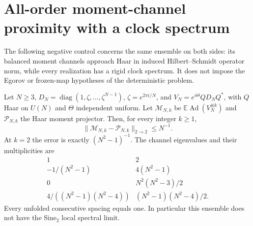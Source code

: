 \section{All-order moment-channel proximity with a clock spectrum}
\label{sec:isospectral-clock-control}
The following negative control concerns the same ensemble on both sides:
its balanced moment channels approach Haar in induced Hilbert--Schmidt
operator norm, while every realization has a rigid clock spectrum. It does
not impose the Egorov or frozen-map hypotheses of the deterministic problem.

\begin{theorem}
Let $N\ge3$, $D_N=\operatorname{diag}(1,\zeta,\ldots,\zeta^{N-1})$,
$\zeta=e^{2\pi i/N}$, and $V_N=e^{i\Theta}QD_NQ^*$, with $Q$ Haar on
$U(N)$ and $\Theta$ independent uniform. Let $\mathcal M_{N,k}$ be
$\mathbb E\operatorname{Ad}(V_N^{\otimes k})$ and $\mathcal P_{N,k}$ the
Haar moment projector. Then, for every integer $k\ge1$,
\[
 \|\mathcal M_{N,k}-\mathcal P_{N,k}\|_{2\to2}\le N^{-1}.
\]
At $k=2$ the error is exactly $(N^2-1)^{-1}$. The channel eigenvalues and
their multiplicities are
\[
\begin{array}{c|c}
1&2\\
-1/(N^2-1)&4(N^2-1)\\
0&N^2(N^2-3)/2\\
4/((N^2-1)(N^2-4))&(N^2-1)(N^2-4)/2.
\end{array}
\]
Every unfolded consecutive spacing equals one. In particular this ensemble
does not have the Sine$_2$ local spectral limit.
\end{theorem}

